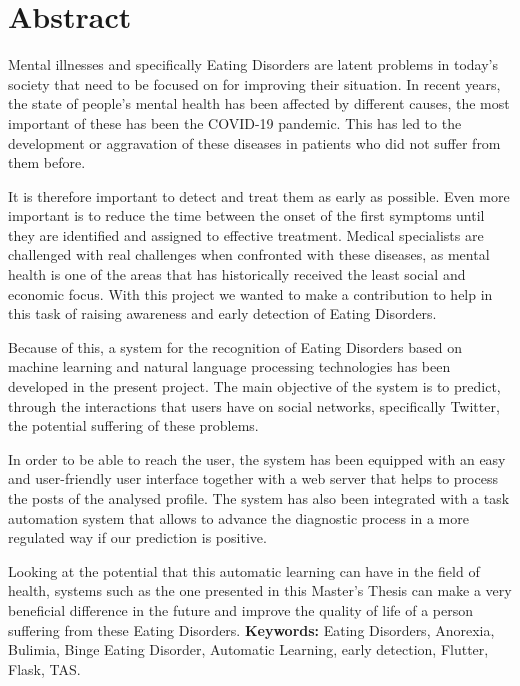 \cleardoublepage
{}
\chapter*{Abstract}

Mental illnesses and specifically Eating Disorders are latent problems in today's society that need to be focused on for improving their situation. In recent years, the state of people's mental health has been affected by different causes, the most important of these has been the COVID-19 pandemic. This has led to the development or aggravation of these diseases in patients who did not suffer from them before.

It is therefore important to detect and treat them as early as possible. Even more important is to reduce the time between the onset of the first symptoms until they are identified and assigned to effective treatment. Medical specialists are challenged with real challenges when confronted with these diseases, as mental health is one of the areas that has historically received the least social and economic focus. With this project we wanted to make a contribution to help in this task of raising awareness and early detection of Eating Disorders.

Because of this, a system for the recognition of Eating Disorders based on machine learning and natural language processing technologies has been developed in the present project. The main objective of the system is to predict, through the interactions that users have on social networks, specifically Twitter, the potential suffering of these problems.

In order to be able to reach the user, the system has been equipped with an easy and user-friendly user interface together with a web server that helps to process the posts of the analysed profile. The system has also been integrated with a task automation system that allows to advance the diagnostic process in a more regulated way if our prediction is positive.

Looking at the potential that this automatic learning can have in the field of health, systems such as the one presented in this Master's Thesis can make a very beneficial difference in the future and improve the quality of life of a person suffering from these Eating Disorders.
\vfill
\textbf{Keywords:} Eating Disorders, Anorexia, Bulimia, Binge Eating Disorder, Automatic Learning, early detection, Flutter, Flask, TAS.